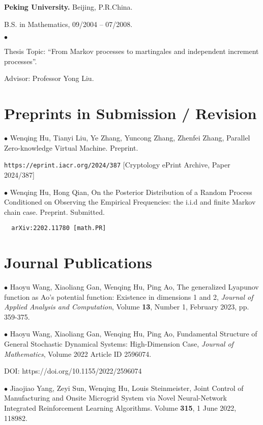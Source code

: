 \documentclass[margin,line]{res}
\newenvironment{list2}{
  \begin{list}{$\bullet$}{%
      \setlength{\itemsep}{0in}
      \setlength{\parsep}{0in} \setlength{\parskip}{0in}
      \setlength{\topsep}{0in} \setlength{\partopsep}{0in}
      \setlength{\leftmargin}{0.2in}}}{\end{list}}
\begin{document}
\begin{resume}
{\bf Peking University.} \hfill Beijing, P.R.China. \\
\vspace*{-.25in}

B.S. in Mathematics, \hfill 09/2004 -- 07/2008.

\begin{list2}
\vspace*{.05in}
\item[] Thesis Topic: ``From Markov processes to martingales and independent
increment processes''.
\item[] Advisor: Professor Yong Liu.
\end{list2}



\section{\sc Preprints in Submission /  Revision}

$\bullet$ Wenqing Hu, Tianyi Liu, Ye Zhang, Yuncong Zhang, Zhenfei Zhang, Parallel Zero-knowledge Virtual Machine. Preprint. 

\verb"https://eprint.iacr.org/2024/387" [Cryptology ePrint Archive, Paper 2024/387]

$\bullet$ Wenqing Hu, Hong Qian, On the Posterior Distribution of a Random Process Conditioned on Observing the Empirical Frequencies: the i.i.d and finite Markov chain case. Preprint. Submitted.

\verb"	arXiv:2202.11780 [math.PR]"


\section{\sc Journal Publications}

$\bullet$ Haoyu Wang, Xiaoliang Gan, Wenqing Hu, Ping Ao, The generalized Lyapunov function as Ao's potential function: Existence in dimensions 1 and 2, \textit{Journal of Applied Analysis and Computation}, Volume \textbf{13}, Number 1, February 2023, pp. 359-375. 


$\bullet$ Haoyu Wang, Xiaoliang Gan, Wenqing Hu, Ping Ao,  Fundamental Structure of General Stochastic Dynamical Systems: High-Dimension Case, \textit{Journal of Mathematics}, Volume 2022 Article ID 2596074.

DOI: https://doi.org/10.1155/2022/2596074

$\bullet$ Jiaojiao Yang, Zeyi Sun, Wenqing Hu, Louis Steinmeister, 
Joint Control of Manufacturing and Onsite Microgrid System via Novel Neural-Network Integrated Reinforcement Learning Algorithms. 
Volume \textbf{315}, 1 June 2022, 118982.



\end{resume}
\end{document}
